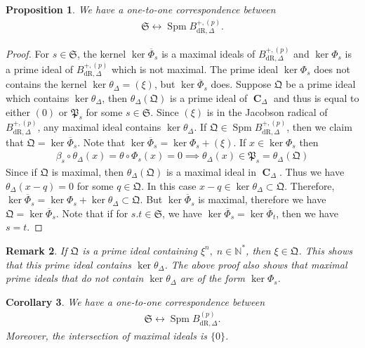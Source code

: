 \documentclass{amsart}
\newtheorem{proposition}{Proposition}[section]
\newtheorem{remark}[proposition]{Remark}
\newtheorem{corollary}[proposition]{Corollary}
\DeclareMathOperator{\spm}{Spm}
\DeclareMathOperator{\C}{\textbf{C}}
\newcommand{\pmBdrp}{B^{+,(p)}_{\mathrm{dR},\Delta}}
\newcommand{\pmBdr}{B^{(p)}_{\mathrm{dR},\Delta}}
\begin{document}
\begin{proposition}\label{Prime Ideal of de Rham period ring}
    We have a one-to-one correspondence between 
    \begin{align*}
        \mathfrak{S}\leftrightarrow\spm\pmBdrp.
    \end{align*}
\end{proposition}

\begin{proof}
    For $s\in\mathfrak{S}$, the kernel $\ker\overline{\Phi}_s$ is a maximal ideals of $\pmBdrp$ and $\ker\Phi_s$ is a prime ideal of $\pmBdrp$ which is not maximal. The prime ideal $\ker\Phi_s$ does not contains the kernel $\ker\theta_\Delta=(\xi)$, but $\ker\overline{\Phi}_s$ does. Suppose $\mathfrak{Q}$ be a prime ideal which contains $\ker\theta_\Delta$, then $\theta_\Delta(\mathfrak{Q})$ is a prime ideal of $\C_\Delta$ and thus is equal to either $(0)$ or $\mathfrak{P}_s$ for some $s\in\mathfrak{S}$. Since $(\xi)$ is in the Jacobson radical of $\pmBdrp$, any maximal ideal contains $\ker\theta_\Delta$. If $\mathfrak{Q}\in\spm\pmBdrp$, then we claim that $\mathfrak{Q}=\ker\overline{\Phi}_s$. Note that $\ker\overline\Phi_s=\ker\Phi_s+(\xi)$. If $x\in\ker\Phi_s$ then 
    \begin{align*}
       \beta_s\circ\theta_\Delta(x)=\theta\circ\Phi_s(x)=0\implies \theta_\Delta(x)\in\mathfrak{P}_s=\theta_\Delta(\mathfrak{Q})
    \end{align*}
    Since if $\mathfrak{Q}$ is maximal, then $\theta_\Delta(\mathfrak{Q})$ is a maximal ideal in $\C_\Delta$. Thus we have $\theta_\Delta(x-q)=0$ for some $q\in\mathfrak{Q}$. In this case $x-q\in \ker\theta_\Delta\subset\mathfrak{Q}$. Therefore, $\ker\overline{\Phi}_s=\ker\Phi_s+\ker\theta_\Delta\subset\mathfrak{Q}$. But $\ker\overline{\Phi}_s$ is maximal, therefore we have $\mathfrak{Q}=\ker\overline\Phi_s$. Note that if for $s.t\in\mathfrak{S}$, we have $\ker\overline\Phi_s=\ker\overline\Phi_t$, then we have $s=t$.
\end{proof}

\begin{remark}\label{Prime ideals containing the kernel}
    If $\mathfrak{Q}$ is a prime ideal containing $\xi^n,\;n\in\mathbb{N}^*$, then $\xi\in\mathfrak{Q}$. This shows that this prime ideal contains $\ker\theta_\Delta$. The above proof also shows that maximal prime ideals that do not contain $\ker\theta_\Delta$ are of the form $\ker\Phi_s$.
\end{remark}

\begin{corollary}\label{Prime ideal of prim-integral period ring}
    We have a one-to-one correspondence between
    \begin{align*}
        \mathfrak{S}\leftrightarrow\spm\pmBdr.
    \end{align*}
    Moreover, the intersection of maximal ideals is $\{0\}$.
\end{corollary}
\end{document}

